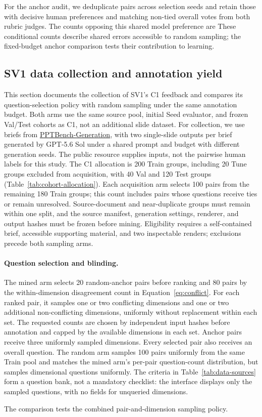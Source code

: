 For the anchor audit, we deduplicate pairs across selection seeds and retain those with decisive human preferences and matching non-tied overall votes from both rubric judges.
The counts opposing this shared model preference are 
These conditional counts describe shared errors accessible to random sampling; the fixed-budget anchor comparison tests their contribution to learning.

\subsection{SV1 data collection and annotation yield}
\label{app:slide-pilot}
This section documents the collection of SV1's C1 feedback and compares its question-selection policy with random sampling under the same annotation budget.
Both arms use the same source pool, initial Seed evaluator, and frozen Val/Test cohorts as C1, not an additional slide dataset.
For collection, we use briefs from \href{https://huggingface.co/datasets/tyrionhuu/PPTBench-Generation}{PPTBench-Generation}, with two single-slide outputs per brief generated by GPT-5.6 Sol under a shared prompt and budget with different generation seeds.
The public resource supplies inputs, not the pairwise human labels for this study.
The C1 allocation is 200 Train groups, including 20 Tune groups excluded from acquisition, with 40 Val and 120 Test groups (Table~\ref{tab:cohort-allocation}).
Each acquisition arm selects 100 pairs from the remaining 180 Train groups; this count includes pairs whose questions receive ties or remain unresolved.
Source-document and near-duplicate groups must remain within one split, and the source manifest, generation settings, renderer, and output hashes must be frozen before mining.
Eligibility requires a self-contained brief, accessible supporting material, and two inspectable renders; exclusions precede both sampling arms.

\paragraph{Question selection and blinding.}
The mined arm selects 20 random-anchor pairs before ranking and 80 pairs by the within-dimension disagreement count in Equation~\ref{eq:conflict}.
For each ranked pair, it samples one or two conflicting dimensions and one or two additional non-conflicting dimensions, uniformly without replacement within each set.
The requested counts are chosen by independent input hashes before annotation and capped by the available dimensions in each set.
Anchor pairs receive three uniformly sampled dimensions.
Every selected pair also receives an overall question.
The random arm samples 100 pairs uniformly from the same Train pool and matches the mined arm's per-pair question-count distribution, but samples dimensional questions uniformly.
The criteria in Table~\ref{tab:data-sources} form a question bank, not a mandatory checklist: the interface displays only the sampled questions, with no fields for unqueried dimensions.

The comparison tests the combined pair-and-dimension sampling policy.

